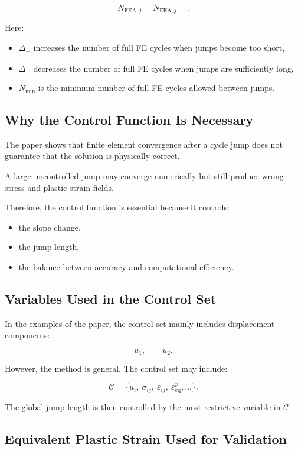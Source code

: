 ﻿\documentclass[11pt,a4paper]{article}
\begin{document}
\[
N_{\mathrm{FEA},j}
=
N_{\mathrm{FEA},j-1}.
\]

Here:

\begin{itemize}[leftmargin=*]
    \item $\Delta_+$ increases the number of full FE cycles when jumps become too short,
    \item $\Delta_-$ decreases the number of full FE cycles when jumps are sufficiently long,
    \item $N_{\min}$ is the minimum number of full FE cycles allowed between jumps.
\end{itemize}

\subsection{Why the Control Function Is Necessary}

The paper shows that finite element convergence after a cycle jump does not guarantee that the solution is physically correct.

A large uncontrolled jump may converge numerically but still produce wrong stress and plastic strain fields.

Therefore, the control function is essential because it controls:

\begin{itemize}[leftmargin=*]
    \item the slope change,
    \item the jump length,
    \item the balance between accuracy and computational efficiency.
\end{itemize}

\subsection{Variables Used in the Control Set}

In the examples of the paper, the control set mainly includes displacement components:

\[
u_1, \qquad u_2.
\]

However, the method is general. The control set may include:

\[
\mathcal{C}
=
\{u_i,\ \sigma_{ij},\ \varepsilon_{ij},\ \varepsilon^p_{\mathrm{eq}}, \ldots\}.
\]

The global jump length is then controlled by the most restrictive variable in $\mathcal{C}$.

\subsection{Equivalent Plastic Strain Used for Validation}
\end{document}
